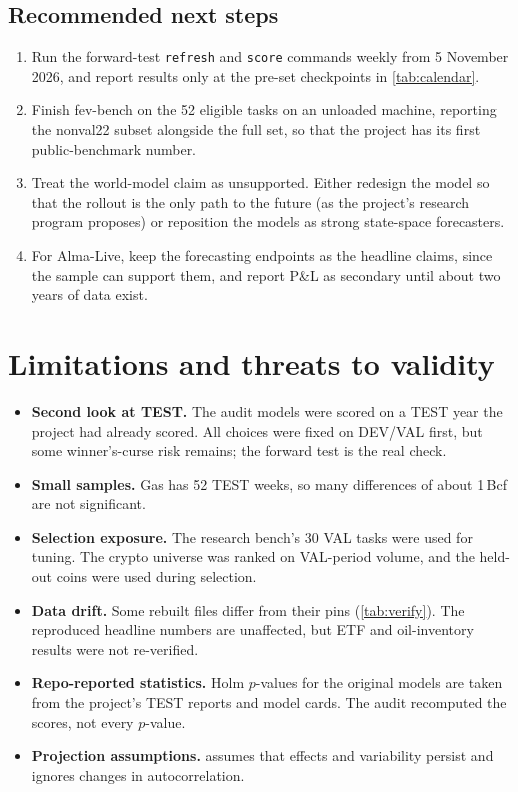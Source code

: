 \documentclass[10pt,a4paper]{article}
\begin{document}
\subsection{Recommended next steps}
\begin{enumerate}
\item Run the forward-test \texttt{refresh} and \texttt{score} commands weekly from 5 November 2026, and report results only at the pre-set checkpoints in \cref{tab:calendar}.
\item Finish fev-bench on the 52 eligible tasks on an unloaded machine, reporting the nonval22 subset alongside the full set, so that the project has its first public-benchmark number.
\item Treat the world-model claim as unsupported. Either redesign the model so that the rollout is the only path to the future (as the project's research program proposes) or reposition the models as strong state-space forecasters.
\item For Alma-Live, keep the forecasting endpoints as the headline claims, since the sample can support them, and report P\&L as secondary until about two years of data exist.
\end{enumerate}

\section{Limitations and threats to validity}
\begin{itemize}
\item \textbf{Second look at TEST.} The audit models were scored on a TEST year the project had already scored. All choices were fixed on DEV/VAL first, but some winner's-curse risk remains; the forward test is the real check.
\item \textbf{Small samples.} Gas has 52 TEST weeks, so many differences of about 1\,Bcf are not significant.
\item \textbf{Selection exposure.} The research bench's 30 VAL tasks were used for tuning. The crypto universe was ranked on VAL-period volume, and the held-out coins were used during selection.
\item \textbf{Data drift.} Some rebuilt files differ from their pins (\cref{tab:verify}). The reproduced headline numbers are unaffected, but ETF and oil-inventory results were not re-verified.
\item \textbf{Repo-reported statistics.} Holm $p$-values for the original models are taken from the project's TEST reports and model cards. The audit recomputed the scores, not every $p$-value.
\item \textbf{Projection assumptions.}  assumes that effects and variability persist and ignores changes in autocorrelation.
\end{itemize}
\end{document}
